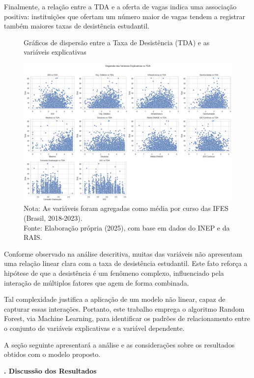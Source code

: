 Finalmente, a relação entre a TDA e a oferta de vagas indica uma associação positiva: instituições que ofertam um número maior de vagas tendem a registrar também maiores taxas de desistência estudantil.

\begin{figure}[H]
    \centering
    \caption{Gráficos de dispersão entre a Taxa de Desistência (TDA) e as variáveis explicativas}
    \label{fig:scatter}
    \includegraphics[width=\textwidth]{fig4_scatter.png}
    \caption*{Nota: As variáveis foram agregadas como média por curso das IFES (Brasil, 2018-2023). \\ Fonte: Elaboração própria (2025), com base em dados do INEP e da RAIS.}
\end{figure}

Conforme observado na análise descritiva, muitas das variáveis não apresentam uma relação linear clara com a taxa de desistência estudantil. Este fato reforça a hipótese de que a desistência é um fenômeno complexo, influenciado pela interação de múltiplos fatores que agem de forma combinada.

Tal complexidade justifica a aplicação de um modelo não linear, capaz de capturar essas interações. Portanto, este trabalho emprega o algoritmo Random Forest, via Machine Learning, para identificar os padrões de relacionamento entre o conjunto de variáveis explicativas e a variável dependente.

A seção seguinte apresentará a análise e as considerações sobre os resultados obtidos com o modelo proposto.


\vspace{2em}
\noindent\textbf{\themanualchapter. Discussão dos Resultados}
\vspace{1em}
\par

